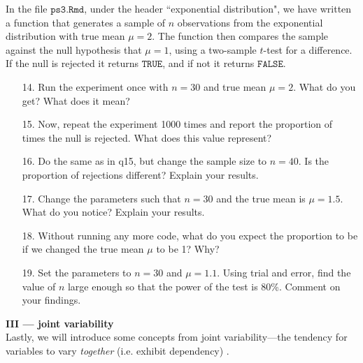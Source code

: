 \documentclass[10pt]{extarticle}
\begin{document}
\newpage

In the file $\texttt{ps3.Rmd}$, under the header ``exponential distribution", we have written a function that generates a sample of $n$ observations from the exponential distribution with true mean $\mu = 2$. The function then compares the sample against the null hypothesis that
$\mu = 1$, using a two-sample $t$-test for a difference. If the null is rejected it returns $\texttt{TRUE}$, and if not it returns $\texttt{FALSE}$.  

\hfill 

\begin{itemize}

	\item[14.] Run the experiment once with $n = 30$ and true mean $\mu = 2$. What do you get? What does it mean? \\ 

	\item[15.] Now, repeat the experiment 1000 times and report the proportion of times the null is rejected. What does this value represent? \\ 

	\item[16.] Do the same as in q15, but change the sample size to $n = 40$. Is the proportion of rejections different? Explain your results. \\ 

	\item[17.] Change the parameters such that $n = 30$ and the true mean is $\mu = 1.5$. What do you notice? Explain your results. \\ 

	\item[18.] Without running any more code, what do you expect the proportion to be if we changed the true mean $\mu$ to be 1? Why? \\ 

	\item[19.] Set the parameters to $n=30$ and $\mu = 1.1$. Using trial and error, find the value of $n$ large enough so that the power of the test is 80\%. Comment on your findings. 

\end{itemize}

\hfill 

{\Large \bf III --- joint variability} \\ 

Lastly, we will introduce some concepts from joint variability---the tendency for variables to vary {\it together} (i.e. exhibit dependency) . \\  
\end{document}
